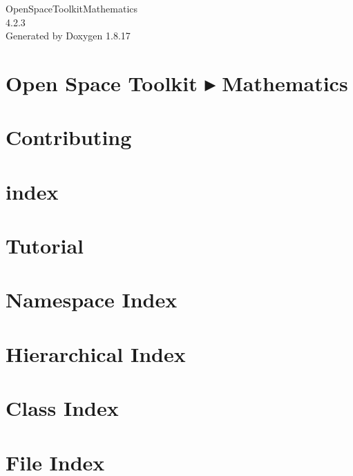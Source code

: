 \let\mypdfximage\pdfximage\def\pdfximage{\immediate\mypdfximage}\documentclass[twoside]{book}
\newcommand{\+}{\discretionary{\mbox{\scriptsize$\hookleftarrow$}}{}{}}
\newcommand{\clearemptydoublepage}{%
  \newpage{\pagestyle{empty}\cleardoublepage}%
}
\begin{document}
\hypersetup{pageanchor=false,
             bookmarksnumbered=true,
             pdfencoding=unicode
            }
\begin{titlepage}
\vspace*{7cm}
\begin{center}%
{\Large Open\+Space\+Toolkit\+Mathematics \\[1ex]\large 4.\+2.\+3 }\\
\vspace*{1cm}
{\large Generated by Doxygen 1.8.17}\\
\end{center}
\end{titlepage}
\clearemptydoublepage
{}
\tableofcontents
\clearemptydoublepage
{}
\hypersetup{pageanchor=true}

\chapter{Open Space Toolkit ▸ Mathematics}
\label{index}\hypertarget{index}{}
\chapter{Contributing}
\label{md__c_o_n_t_r_i_b_u_t_i_n_g}

\chapter{index}
\label{md_docs_index}

\chapter{Tutorial}
\label{md_docs__tutorial}

\chapter{Namespace Index}

\chapter{Hierarchical Index}

\chapter{Class Index}

\chapter{File Index}

\end{document}
